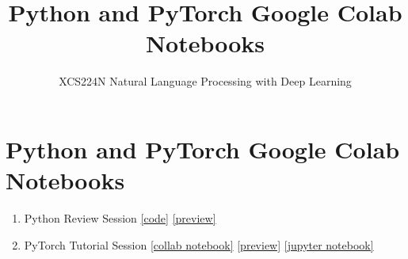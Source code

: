 \documentclass{article}
\title{Python and PyTorch Google Colab Notebooks}
\author{XCS224N Natural Language Processing with Deep Learning}
\date{}
\begin{document}
\maketitle

\section{Python and PyTorch Google Colab Notebooks}
\begin{enumerate}
    \item Python Review Session \href{http://web.stanford.edu/class/cs224n/readings/cs224n-python-review-code-updated.zip}{[code]} \href{http://web.stanford.edu/class/cs224n/readings/cs224n-python-review-code-updated.pdf}{[preview]}
    \item PyTorch Tutorial Session \href{https://colab.research.google.com/drive/1Z6K6nwbb69XfuInMx7igAp-NNVj_2xc3?usp=sharing}{[collab notebook]} \href{http://web.stanford.edu/class/cs224n/materials/CS224N_PyTorch_Tutorial.html}{[preview]} \href{http://web.stanford.edu/class/cs224n/materials/CS224N%20PyTorch%20Tutorial.ipynb}{[jupyter notebook]}
\end{enumerate}
\end{document}
